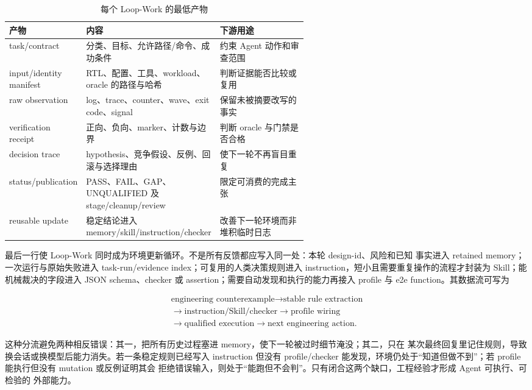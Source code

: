 \documentclass[UTF8,a4paper,zihao=-4,oneside]{ctexart}
\begin{document}
\begin{table}[H]
  \centering
  \small
  \caption{每个 Loop-Work 的最低产物}
  \label{tab:loop-artifacts}
  \begin{tabularx}{\linewidth}{@{}L{0.25\linewidth}L{0.32\linewidth}Y@{}}
    \toprule
    产物 & 内容 & 下游用途 \\
    \midrule
    task/contract & 分类、目标、允许路径/命令、成功条件 & 约束 Agent 动作和审查范围 \\
    input/identity manifest & RTL、配置、工具、workload、oracle 的路径与哈希 & 判断证据能否比较或复用 \\
    raw observation & log、trace、counter、wave、exit code、signal & 保留未被摘要改写的事实 \\
    verification receipt & 正向、负向、marker、计数与边界 & 判断 oracle 与门禁是否合格 \\
    decision trace & hypothesis、竞争假设、反例、回滚与选择理由 & 使下一轮不再盲目重复 \\
    status/publication & PASS、FAIL、GAP、UNQUALIFIED 及 stage/cleanup/review & 限定可消费的完成主张 \\
    reusable update & 稳定结论进入 memory/skill/instruction/checker & 改善下一轮环境而非堆积临时日志 \\
    \bottomrule
  \end{tabularx}
\end{table}

最后一行使 Loop-Work 同时成为环境更新循环。不是所有反馈都应写入同一处：本轮 design-id、风险和已知
事实进入 retained memory；一次运行与原始失败进入 task-run/evidence index；可复用的人类决策规则进入
instruction，短小且需要重复操作的流程才封装为 Skill；能机械裁决的字段进入 JSON schema、checker 或
assertion；需要自动发现和执行的能力再接入 profile 与 e2e function。其数据流可写为

\[
\begin{gathered}
\text{engineering counterexample}\rightarrow\text{stable rule extraction}\\
\rightarrow\text{instruction/Skill/checker}\rightarrow\text{profile wiring}\\
\rightarrow\text{qualified execution}\rightarrow\text{next engineering action}.
\end{gathered}
\]

这种分流避免两种相反错误：其一，把所有历史过程塞进 memory，使下一轮被过时细节淹没；其二，只在
某次最终回复里记住规则，导致换会话或换模型后能力消失。若一条稳定规则已经写入 instruction 但没有
profile/checker 能发现，环境仍处于“知道但做不到”；若 profile 能执行但没有 mutation 或反例证明其会
拒绝错误输入，则处于“能跑但不会判”。只有闭合这两个缺口，工程经验才形成 Agent 可执行、可检验的
外部能力。
\end{document}
